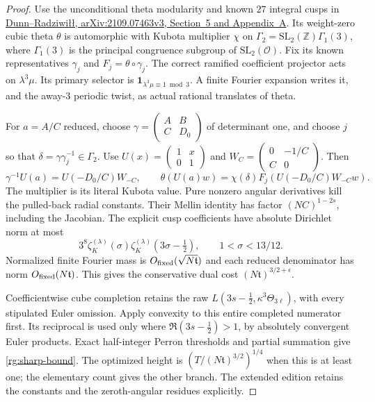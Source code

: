 \begin{proof}
Use the unconditional theta modularity and known \(27\) integral
cusps in
\href{https://arxiv.org/abs/2109.07463v3}{Dunn--Radziwi\l\l,
arXiv:2109.07463v3, Section~5 and Appendix~A}.
Its weight-zero cubic theta \(\theta\) is automorphic with
Kubota multiplier \(\chi\) on
\(\Gamma_2=\mathrm{SL}_2(\mathbb Z)\Gamma_1(3)\), where
\(\Gamma_1(3)\) is the principal congruence subgroup of
\(\mathrm{SL}_2(\mathcal O)\). Fix its known representatives
\(\gamma_j\) and \(F_j=\theta\circ\gamma_j\).
The correct ramified coefficient projector acts on
\(\lambda^3\mu\). Its primary selector is
\(\mathbf1_{\lambda^3\mu\equiv1\bmod3}\).
A finite Fourier expansion writes it, and the away-\(3\) periodic
twist, as actual rational translates of theta.

For \(a=A/C\) reduced, choose
\(\gamma=\left(\begin{smallmatrix}A&B\\C&D_0\end{smallmatrix}\right)\)
of determinant one, and choose \(j\) so that
\(\delta=\gamma\gamma_j^{-1}\in\Gamma_2\).
Use \(U(x)=\left(\begin{smallmatrix}1&x\\0&1\end{smallmatrix}\right)\)
and \(W_C=\left(\begin{smallmatrix}0&-1/C\\C&0\end{smallmatrix}\right)\).
Then
\[
 \gamma^{-1}U(a)=U(-D_0/C)W_{-C},\qquad
 \theta(U(a)w)=\chi(\delta)F_j(U(-D_0/C)W_{-C}w).
\]
The multiplier is its literal Kubota value. Pure nonzero angular
derivatives kill the pulled-back radial constants. Their Mellin
identity has factor \((NC)^{1-2s}\), including the Jacobian.
The explicit cusp coefficients have absolute Dirichlet norm at most
\[
 3^8\zeta_K^{(\lambda)}(\sigma)
                  \zeta_K^{(\lambda)}(3\sigma-\tfrac12),
 \qquad 1<\sigma<13/12 .
\]
Normalized finite Fourier mass is \(O_{\rm fixed}(\sqrt{N\mathfrak t})\)
and each reduced denominator has norm
\(O_{\rm fixed}(N\mathfrak t)\). This gives the conservative dual
cost \((N\mathfrak t)^{3/2+\epsilon}\).

Coefficientwise cube completion retains the raw
\(L(3s-\tfrac12,\kappa^3\Theta_{3\ell})\), with every stipulated
Euler omission. Apply convexity to this entire completed numerator
first. Its reciprocal is used only where
\(\Re(3s-\tfrac12)>1\), by absolutely convergent Euler products.
Exact half-integer Perron thresholds and partial summation give
\eqref{rg:sharp-bound}. The optimized height is
\((T/(N\mathfrak t)^{3/2})^{1/4}\) when this is at least one;
the elementary count gives the other branch. The extended edition retains the constants and the zeroth-angular
residues explicitly.
\end{proof}

